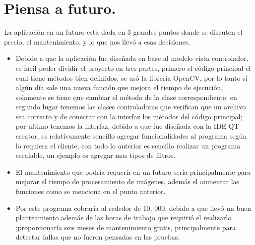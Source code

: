 \documentclass{article}
\begin{document}
\section{Piensa a futuro.}
La aplicación en un futuro esta dada en 3 grandes puntos donde se discuten el precio, el mantenimiento, y lo que nos llevó a esas decisiones.
\begin{itemize}
\item Debido a que la aplicación fue diseñada en base al modelo vista controlador, es fácil poder dividir el proyecto en tres partes, primero el código principal el cual tiene métodos bien definidos, se usó la librería OpenCV, por lo tanto si algún día sale una nueva función que mejora el tiempo de ejecución, solamente se tiene que cambiar el método de la clase correspondiente; en segundo lugar tenemos las clases controladoras que verifican que un archivo sea correcto y de conectar con la interfaz los métodos del código principal; por ultimo tenemos la interfaz, debido a que fue diseñada con la IDE QT creator, es relativamente sencillo agregar funcionalidades al programa según lo requiera el cliente, con todo lo anterior es sencillo realizar un programa escalable, un ejemplo es agregar mas tipos de filtros.
\item El mantenimiento que podría requerir en un futuro sería principalmente para mejorar el tiempo de procesamiento de imágenes, además el aumentar las funciones como se menciona en el punto anterior.
\item Por este programa cobraría al rededor de 10, 000, debido a que llevó un buen planteamiento además de las horas de trabajo que requirió el realizarlo ;proporcionaría seis meses de mantenimiento gratis, principalmente para detectar fallas que no fueron pensadas en las pruebas.
\end{itemize}
\end{document}
